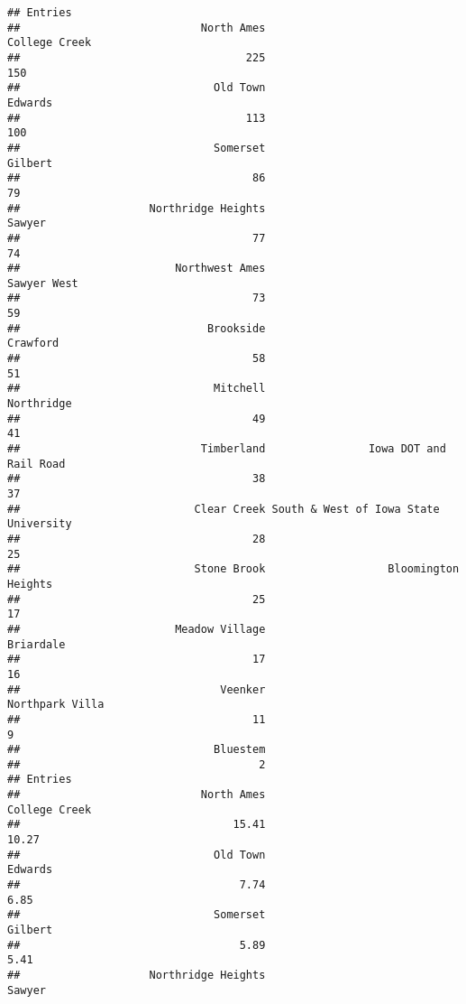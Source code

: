 \documentclass[
]{article}
\begin{document}
\begin{verbatim}
## Entries
##                            North Ames                         College Creek 
##                                   225                                   150 
##                              Old Town                               Edwards 
##                                   113                                   100 
##                              Somerset                               Gilbert 
##                                    86                                    79 
##                    Northridge Heights                                Sawyer 
##                                    77                                    74 
##                        Northwest Ames                           Sawyer West 
##                                    73                                    59 
##                             Brookside                              Crawford 
##                                    58                                    51 
##                              Mitchell                            Northridge 
##                                    49                                    41 
##                            Timberland                Iowa DOT and Rail Road 
##                                    38                                    37 
##                           Clear Creek South & West of Iowa State University 
##                                    28                                    25 
##                           Stone Brook                   Bloomington Heights 
##                                    25                                    17 
##                        Meadow Village                             Briardale 
##                                    17                                    16 
##                               Veenker                       Northpark Villa 
##                                    11                                     9 
##                              Bluestem 
##                                     2 
## Entries
##                            North Ames                         College Creek 
##                                 15.41                                 10.27 
##                              Old Town                               Edwards 
##                                  7.74                                  6.85 
##                              Somerset                               Gilbert 
##                                  5.89                                  5.41 
##                    Northridge Heights                                Sawyer 

\end{verbatim}
\end{document}
